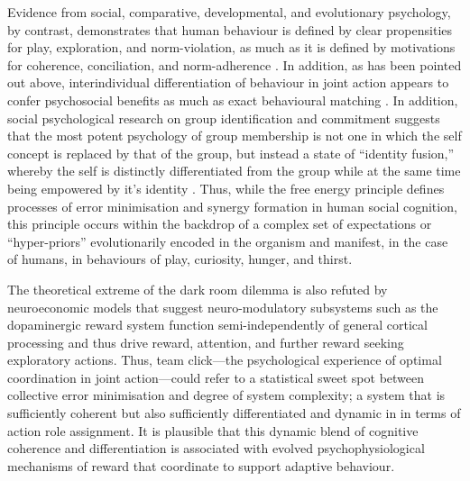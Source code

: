 \begin{CJK}{UTF8}{gbsn}
{Evidence from social, comparative, developmental, and evolutionary psychology, by contrast, demonstrates that human behaviour is defined by clear propensities for play, exploration, and norm-violation, as much as it is defined by motivations for coherence, conciliation, and norm-adherence \citep{McNeill1995,Huizinga2003}. In addition, as has been pointed out above, interindividual differentiation of behaviour in joint action appears to confer psychosocial benefits as much as exact behavioural matching \citep{Milward2016}.
In addition, social psychological research on group identification and commitment suggests that the most potent psychology of group membership is not one in which the self concept is replaced by that of the group, but instead a state of ``identity fusion,'' whereby the self is distinctly differentiated from the group while at the same time being empowered by it's identity \citep{Swann2012,Swann2015,Whitehouse2014}. Thus, while the free energy principle defines processes of error minimisation and synergy formation in human social cognition, this principle occurs within the backdrop of a complex set of expectations or ``hyper-priors'' evolutionarily encoded in the organism and manifest, in the case of humans, in behaviours of play, curiosity, hunger, and thirst\citep{Clark2013}.

The theoretical extreme of the dark room dilemma is also refuted by neuroeconomic models that suggest neuro-modulatory subsystems such as the dopaminergic reward system function semi-independently of general cortical processing and thus drive reward, attention, and further reward seeking exploratory actions\citep{Ross2013}.
Thus, team click---the psychological experience of optimal coordination in joint action---could refer to a statistical sweet spot between collective error minimisation and degree of system complexity; a system that is sufficiently coherent but also sufficiently differentiated and dynamic in in terms of action role assignment.  It is plausible that this dynamic blend of cognitive coherence and differentiation is associated with evolved psychophysiological mechanisms of reward that coordinate to support adaptive behaviour\citep{Friston2010,Clark2013}.

}
\end{CJK}

